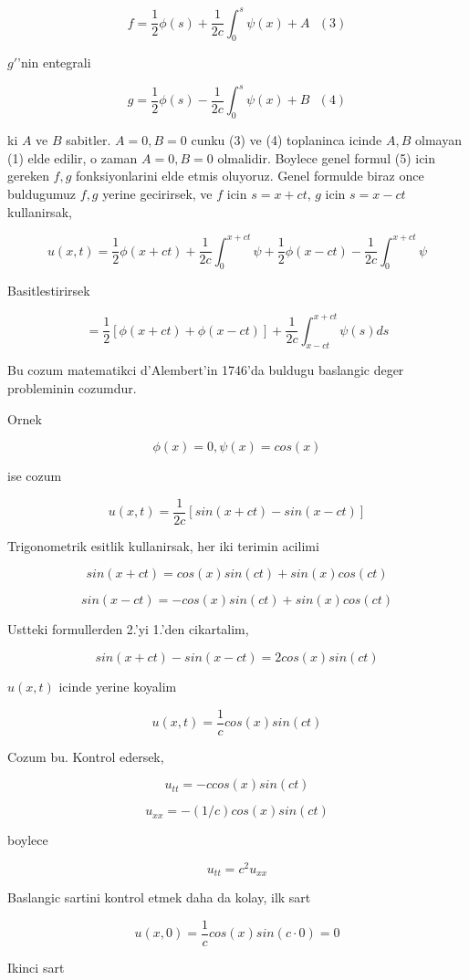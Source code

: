 \documentclass[12pt,fleqn]{article}
\begin{document}
\[ f = \frac{1}{2}\phi(s) + \frac{1}{2c} \int_0^s \psi(x) + A 
\ \ \ (3)
\]

$g'$'nin entegrali

\[ g = \frac{1}{2}\phi(s) - \frac{1}{2c} \int_0^s \psi(x) + B
\ \ \ (4)
\]


ki $A$ ve $B$ sabitler. $A=0,B=0$ cunku (3) ve (4) toplaninca icinde $A,B$
olmayan (1) elde edilir, o zaman $A=0,B=0$ olmalidir. Boylece genel formul
(5) icin gereken $f,g$ fonksiyonlarini elde etmis oluyoruz. Genel formulde
biraz once buldugumuz $f,g$ yerine gecirirsek, ve $f$ icin $s = x+ct$, $g$
icin $s = x-ct$ kullanirsak,

\[ u(x,t) = 
\frac{1}{2}\phi(x+ct) + 
\frac{1}{2c} \int_0 ^{x+ct} \psi + 
\frac{1}{2}\phi(x-ct) -
\frac{1}{2c} \int_0 ^{x+ct} \psi 
 \]

Basitlestirirsek 

\[ = \frac{1}{2}[\phi(x+ct) + \phi(x-ct)] + 
\frac{1}{2c} \int_{x-ct} ^{x+ct} \psi (s) ds
 \]

Bu cozum matematikci d'Alembert'in 1746'da buldugu baslangic deger
probleminin cozumdur. 

Ornek

\[ \phi(x) = 0, \psi(x) = cos(x) \] 

ise cozum 

\[ u(x,t) = \frac{1}{2c}[sin(x+ct) - sin(x-ct)] \]

Trigonometrik esitlik kullanirsak, her iki terimin acilimi

\[ sin(x+ct) = cos(x)sin(ct) + sin(x)cos(ct) \]

\[ sin(x-ct) = -cos(x)sin(ct) + sin(x)cos(ct) \]

Ustteki formullerden 2.'yi 1.'den cikartalim, 

\[ sin(x+ct) - sin(x-ct) = 2cos(x)sin(ct) \]

$u(x,t)$ icinde yerine koyalim

\[ u(x,t) = \frac{1}{c}cos(x)sin(ct) \]

Cozum bu. Kontrol edersek, 

\[ u_{tt} = -c cos(x)sin(ct) \]

\[ u_{xx} = -(1/c)cos(x)sin(ct) \]

boylece 

\[ u_{tt} = c^2 u_{xx} \]

Baslangic sartini kontrol etmek daha da kolay, ilk sart

\[ u(x,0) = \frac{1}{c}cos(x)sin(c \cdot 0)  = 0\]

Ikinci sart
\end{document}

